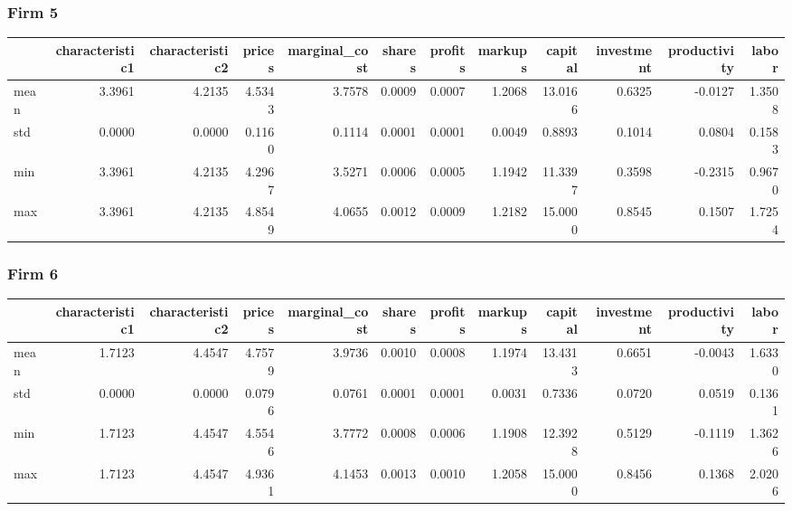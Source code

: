  \subsubsection*{Firm 5}
\begin{tabular}{lrrrrrrrrrrr}
\toprule
{} &  characteristic1 &  characteristic2 &  prices &  marginal\_cost &  shares &  profits &  markups &  capital &  investment &  productivity &  labor \\
\midrule
mean &           3.3961 &           4.2135 &  4.5343 &         3.7578 &  0.0009 &   0.0007 &   1.2068 &  13.0166 &      0.6325 &       -0.0127 & 1.3508 \\
std  &           0.0000 &           0.0000 &  0.1160 &         0.1114 &  0.0001 &   0.0001 &   0.0049 &   0.8893 &      0.1014 &        0.0804 & 0.1583 \\
min  &           3.3961 &           4.2135 &  4.2967 &         3.5271 &  0.0006 &   0.0005 &   1.1942 &  11.3397 &      0.3598 &       -0.2315 & 0.9670 \\
max  &           3.3961 &           4.2135 &  4.8549 &         4.0655 &  0.0012 &   0.0009 &   1.2182 &  15.0000 &      0.8545 &        0.1507 & 1.7254 \\
\bottomrule
\end{tabular}


 \subsubsection*{Firm 6}
\begin{tabular}{lrrrrrrrrrrr}
\toprule
{} &  characteristic1 &  characteristic2 &  prices &  marginal\_cost &  shares &  profits &  markups &  capital &  investment &  productivity &  labor \\
\midrule
mean &           1.7123 &           4.4547 &  4.7579 &         3.9736 &  0.0010 &   0.0008 &   1.1974 &  13.4313 &      0.6651 &       -0.0043 & 1.6330 \\
std  &           0.0000 &           0.0000 &  0.0796 &         0.0761 &  0.0001 &   0.0001 &   0.0031 &   0.7336 &      0.0720 &        0.0519 & 0.1361 \\
min  &           1.7123 &           4.4547 &  4.5546 &         3.7772 &  0.0008 &   0.0006 &   1.1908 &  12.3928 &      0.5129 &       -0.1119 & 1.3626 \\
max  &           1.7123 &           4.4547 &  4.9361 &         4.1453 &  0.0013 &   0.0010 &   1.2058 &  15.0000 &      0.8456 &        0.1368 & 2.0206 \\
\bottomrule
\end{tabular}


